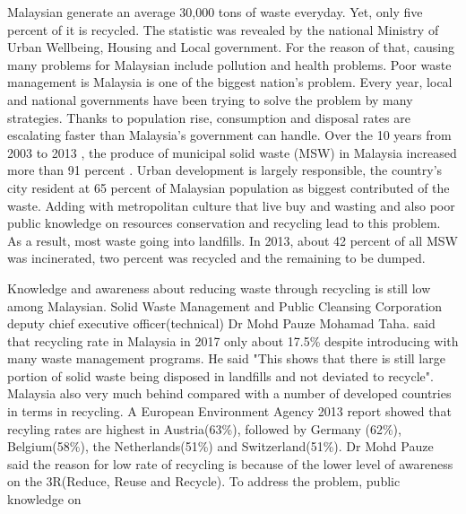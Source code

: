 \documentclass[12pt]{article}
\begin{document}
Malaysian generate an average 30,000 tons of waste everyday. Yet, only five percent of it is recycled. The statistic was revealed by the national Ministry of Urban Wellbeing, Housing and Local government. For the reason of that, causing many problems for Malaysian include pollution and health problems. Poor waste management is Malaysia is one of the biggest nation's problem. Every year, local and national governments have been trying to solve the problem by many strategies. Thanks to population rise, consumption and disposal rates are escalating faster than Malaysia's government can handle. Over the 10 years from 2003 to 2013 , the produce of municipal solid waste (MSW) in Malaysia increased more than 91 percent \cite{91percent}. Urban development is largely responsible, the country's city resident at 65 percent of Malaysian population as biggest contributed of the waste. Adding with metropolitan culture that live buy and wasting and also poor public knowledge on resources conservation and recycling lead to this problem. As a result, most waste going into landfills. In 2013, about 42 percent \cite{91percent} of all MSW was incinerated, two percent was recycled and the remaining to be dumped.

\par

Knowledge and awareness about reducing waste through recycling is still low among Malaysian. Solid Waste Management and Public Cleansing Corporation deputy chief executive officer(technical) Dr Mohd Pauze Mohamad Taha. said that recycling rate in Malaysia in 2017 only about 17.5\% despite introducing with many waste management programs. He said "This shows that there is still large portion of solid waste being disposed in landfills and not deviated to recycle". Malaysia also very much behind compared with a number of developed countries in terms in recycling. A European Environment Agency 2013 report showed that recyling rates are highest in Austria(63\%), followed by Germany (62\%), Belgium(58\%), the Netherlands(51\%) and Switzerland(51\%). Dr Mohd Pauze said the reason for low rate of recycling is because of the lower level of awareness on the 3R(Reduce, Reuse and Recycle).
To address the problem, public knowledge on 
\end{document}
